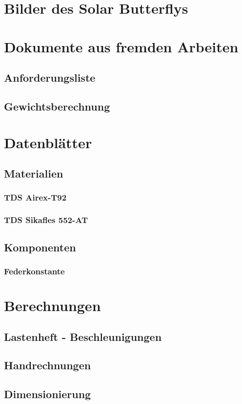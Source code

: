 \section{Bilder des Solar Butterflys}
\label{Bilder des Solar Butterflys}

\section{Dokumente aus fremden Arbeiten}
  \subsection{Anforderungsliste}
  \label{e:Anforderungsliste}
  \subsection{Gewichtsberechnung}
  \label{e:Gewichtsberechnung}




\section{Datenblätter}
  \subsection{Materialien}
  \label{e:Materialien}
    \subsubsection{TDS Airex-T92}
    \label{Airex}
    \subsubsection{TDS Sikafles 552-AT}
    \label{Sikaflex}


  \subsection{Komponenten}
    \subsubsection{Federkonstante}
    \label{Federkonstante}




\section{Berechnungen}
\label{e:Berechnungen}
  \subsection{Lastenheft - Beschleunigungen}
  \label{e:Lastenheft}
  \subsection{Handrechnungen}
  \label{e:Handrechnungen}
  \subsection{Dimensionierung}
  \label{e:Dimensionierung}

